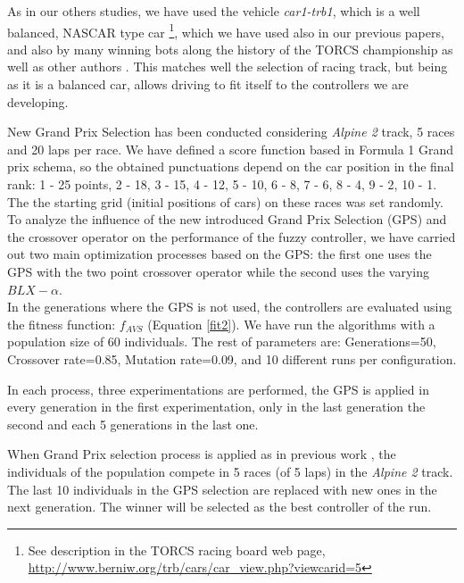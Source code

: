 \documentclass[10pt,journal,compsoc]{IEEEtran}
\begin{document}
As in our others studies, we have used the vehicle \textit{car1-trb1},
which is a well balanced, NASCAR type car \footnote{See description in
  the TORCS racing board web page,
  \url{http://www.berniw.org/trb/cars/car_view.php?viewcarid=5}},
which we have used also in our previous papers, and also by many
winning bots along the history of the TORCS championship
\cite{torcs5} as well as other authors
\cite{auteur2010,li2019reinforcement}. This matches well the selection
of racing track, but being as it is a balanced car, allows driving to
fit itself to the controllers we are developing.

New Grand Prix Selection has been conducted considering \textit{Alpine 2} track, 5 races and 20 laps per race. 
We have defined a score function based in Formula 1 Grand prix schema, so the obtained punctuations depend on the car position in the final rank: 1 - 25 points, 2 - 18, 3 - 15, 4 - 12, 5 - 10, 6 - 8, 7 - 6, 8 - 4, 9 - 2, 10 - 1. The the starting grid (initial positions of cars) on these races was set randomly.\\

To analyze the influence of the new introduced Grand Prix Selection (GPS) and the crossover operator on the performance of the fuzzy controller, we have carried out  two main optimization processes based on the GPS: the first one uses the GPS with the two point crossover operator while the second uses the varying $BLX-\alpha$. \\
In the generations where the GPS is not used, the controllers are evaluated using the fitness function: $f_{AVS}$ (Equation \ref{fit2}).
We have run the algorithms with a population size of 60
individuals. The rest of parameters are: Generations=50, Crossover
rate=0.85, Mutation rate=0.09, and 10 different runs per
configuration. %

In each process, three experimentations are performed, the GPS is
applied in every generation in the first experimentation, only in the
last generation the second and each 5 generations in the last one. %
 
When Grand Prix selection process is applied as in previous work \cite{salem_cig2018}, the individuals of the population compete in 5 races (of 5 laps) in the \textit{Alpine 2} track. The last 10 individuals  in the GPS selection are replaced with new ones in the next generation. The winner will be selected as the best controller of the run.
\end{document}
